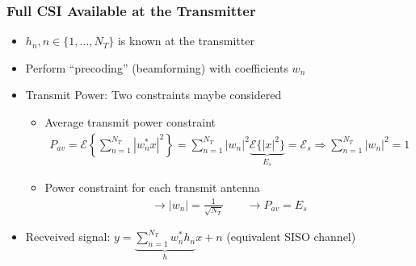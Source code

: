 \documentclass[a4paper, 10pt]{article}
\begin{document}
\subsubsection{Full CSI Available at the Transmitter}
\begin{itemize}
	\item $h_n, n \in \{1,\dots,N_T\}$ is known at the transmitter
	\item Perform ``precoding'' (beamforming) with coefficients $w_n$
\end{itemize}

\begin{itemize}
	\item Transmit Power: Two constraints maybe considered
	\begin{itemize}
		\item Average transmit power constraint
		\begin{align*}
		P_{av}=\mathcal{E}\left\{\sum\limits^{N_T}_{n=1}|w_n^*x|^2\right\}=\sum\limits_{n=1}^{N_T}|w_n|^2\underbrace{\mathcal{E}\{|x|^2\}}_{E_s}=\mathcal{E}_s \Rightarrow \sum\limits^{N_T}_{n=1}|w_n|^2=1
		\end{align*}
		\item Power constraint for each transmit antenna
		\begin{align*}
		\rightarrow |w_n|=\frac{1}{\sqrt{N_T}} \qquad \rightarrow P_{av}=E_s
		\end{align*}
	\end{itemize}
	\item Recveived signal: $y=\underbrace{\sum\limits^{N_T}_{n=1}w^*_nh_n}_{h}x+n$ (equivalent SISO channel)
\end{itemize}
\end{document}
